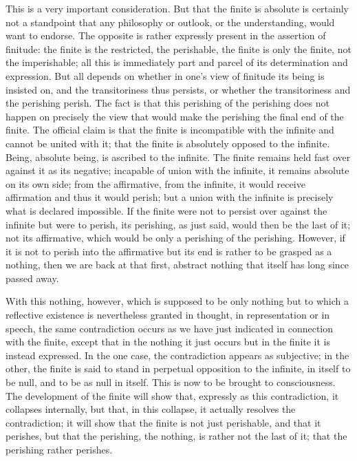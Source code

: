 This is a very important consideration.
But that the finite is absolute is
certainly not a standpoint that any philosophy or outlook,
or the understanding, would want to endorse.
The opposite is rather expressly present
in the assertion of finitude:
the finite is the restricted, the perishable, the
finite is only the finite, not the imperishable;
all this is immediately part
and parcel of its determination and expression.
But all depends on whether
in one's view of finitude its being is insisted on,
and the transitoriness thus persists,
or whether the transitoriness and the perishing perish.
The fact is that this perishing of the perishing does not happen
on precisely the view that would make
the perishing the final end of the finite.
The official claim is that the finite is
incompatible with the infinite
and cannot be united with it;
that the finite is absolutely opposed to the infinite.
Being, absolute being, is ascribed to the infinite.
The finite remains held fast over against it as its negative;
incapable of union with the infinite,
it remains absolute on its own side;
from the affirmative, from the infinite,
it would receive affirmation and thus it would perish;
but a union with the infinite is precisely
what is declared impossible.
If the finite were not to persist over against the infinite
but were to perish, its perishing, as just said,
would then be the last of it;
not its affirmative, which would be only
a perishing of the perishing.
However, if it is not to perish into the affirmative
but its end is rather to be grasped as a nothing,
then we are back at that first, abstract nothing
that itself has long since passed away.

With this nothing, however, which is supposed to be only nothing
but to which a reflective existence is nevertheless granted
in thought, in representation or in speech,
the same contradiction occurs as we have
just indicated in connection with the finite,
except that in the nothing it just occurs
but in the finite it is instead expressed.
In the one case, the contradiction appears as subjective;
in the other, the finite is said to stand
in perpetual opposition to the infinite,
in itself to be null, and to be as null in itself.
This is now to be brought to consciousness.
The development of the finite will show that,
expressly as this contradiction, it collapses internally,
but that, in this collapse, it actually resolves the contradiction;
it will show that the finite is not just perishable, and that it perishes,
but that the perishing, the nothing, is rather not the last of it;
that the perishing rather perishes.

